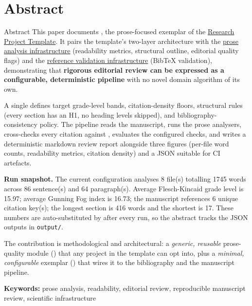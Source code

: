 \documentclass[
  ignorenonframetext,
]{beamer}
\author{\texorpdfstring{}{}}
\date{}
\begin{document}
\section{Abstract}\label{sec:abstract}

\begin{frame}{Abstract}
This paper documents , the
prose-focused exemplar of the
\href{https://github.com/docxology/template}{Research Project Template}.
It pairs the template's two-layer architecture with the
\href{https://github.com/docxology/template/tree/main/infrastructure/prose}{prose
analysis infrastructure} (readability metrics, structural outline,
editorial quality flags) and the
\href{https://github.com/docxology/template/tree/main/infrastructure/reference}{reference
validation infrastructure} (BibTeX validation), demonstrating that
\textbf{rigorous editorial review can be expressed as a configurable,
deterministic pipeline} with no novel domain algorithm of its own.

A single  defines target grade-level
bands, citation-density floors, structural rules (every section has an
H1, no heading levels skipped), and bibliography-consistency policy. The
pipeline reads the manuscript, runs the prose analysers, cross-checks
every \texttt{\breakseq{[@key]}} citation against
, evaluates the configured checks, and
writes a deterministic markdown review report alongside three figures
(per-file word counts, readability metrics, citation density) and a JSON
 suitable for CI artefacts.

\textbf{Run snapshot.} The current configuration analyses 8 file(s)
totalling 1745 words across 86 sentence(s) and 64 paragraph(s). Average
Flesch-Kincaid grade level is 15.97; average Gunning Fog index is 16.73;
the manuscript references 6 unique citation key(s); the longest section
is 416 words and the shortest is 17. These numbers are auto-substituted
by  after every
run, so the abstract tracks the JSON outputs in \texttt{output/}.

The contribution is methodological and architectural: a \emph{generic,
reusable} prose-quality module () that any
project in the template can opt into, plus a \emph{minimal,
configurable} exemplar
() that wires it to
the bibliography and the manuscript pipeline.

\textbf{Keywords:} prose analysis, readability, editorial review,
reproducible manuscript review, scientific infrastructure
\end{frame}
\end{document}
